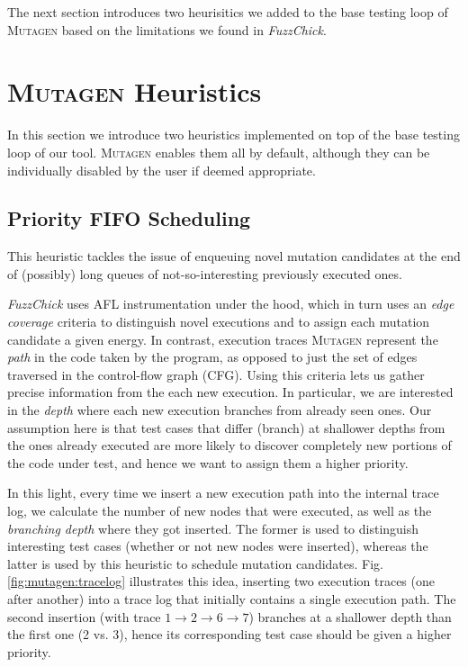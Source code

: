 \documentclass[acmsmall, anonymous]{acmart}
\newcommand{\fuzzchick}{\textit{FuzzChick}\xspace}
\newcommand{\mutagen}{\textsc{Mutagen}\xspace}
\begin{document}
The next section introduces two heurisitics we added to the base testing loop of
\mutagen based on the limitations we found in \fuzzchick.
%


\section{\mutagen Heuristics}
\label{sec:heuristics}

In this section we introduce two heuristics implemented on top of the base
testing loop of our tool.
%
\mutagen enables them all by default, although they can be individually disabled
by the user if deemed appropriate.

\subsection{Priority FIFO Scheduling}

This heuristic tackles the issue of enqueuing novel mutation candidates at the
end of (possibly) long queues of not-so-interesting previously executed ones.

\fuzzchick uses AFL instrumentation under the hood, which in turn uses an
\emph{edge coverage} criteria to distinguish novel executions and to assign each
mutation candidate a given energy.
%
In contrast, execution traces \mutagen represent the \emph{path} in the code
taken by the program, as opposed to just the set of edges traversed in the
control-flow graph (CFG).
%
Using this criteria lets us gather precise information from the each new
execution.
%
In particular, we are interested in the \emph{depth} where each new execution
branches from already seen ones.
%
Our assumption here is that test cases that differ (branch) at shallower depths
from the ones already executed are more likely to discover completely new
portions of the code under test, and hence we want to assign them a higher
priority.


In this light, every time we insert a new execution path into the internal trace
log, we calculate the number of new nodes that were executed, as well as the
\emph{branching depth} where they got inserted.
%
The former is used to distinguish interesting test cases (whether or not new
nodes were inserted), whereas the latter is used by this heuristic to schedule
mutation candidates.
%
Fig. \ref{fig:mutagen:tracelog} illustrates this idea, inserting two execution
traces (one after another) into a trace log that initially contains a single
execution path.
%
The second insertion (with trace $1 \rightarrow 2 \rightarrow 6 \rightarrow 7$)
branches at a shallower depth than the first one (2 vs. 3), hence its
corresponding test case should be given a higher priority.
\end{document}
